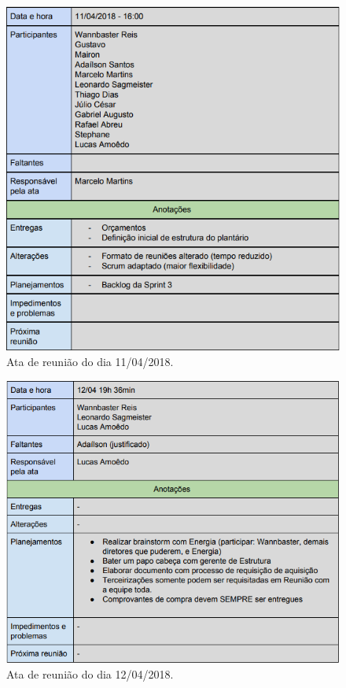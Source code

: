 \begin{apendicesenv}
\begin{figure}[H]
	\centering
	\includegraphics[width=15cm]{figuras/apendice_d.png}
	\caption{Ata de reunião do dia 11/04/2018.
	} \label{apendice_d}
\end{figure}

\begin{figure}[H]
	\centering
	\includegraphics[width=15cm]{figuras/apendice_e.png}
	\caption{Ata de reunião do dia 12/04/2018.
	} \label{apendice_e}
\end{figure}


\end{apendicesenv}
